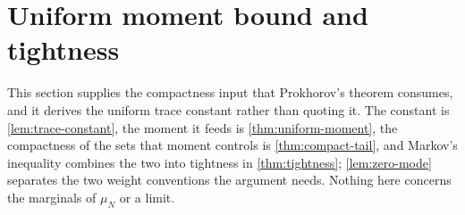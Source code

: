 %
\section{Uniform moment bound and tightness}\label{sec:tightness}

This section supplies the compactness input that Prokhorov's theorem
consumes, and it derives the uniform trace constant rather than quoting it.
The constant is \cref{lem:trace-constant}, the moment it feeds is
\cref{thm:uniform-moment}, the compactness of the sets that moment controls
is \cref{thm:compact-tail}, and Markov's inequality combines the two into
tightness in \cref{thm:tightness}; \cref{lem:zero-mode} separates the two
weight conventions the argument needs. Nothing here concerns the marginals
of $\mu_N$ or a limit.

